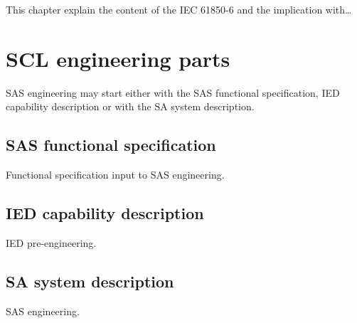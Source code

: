 This chapter explain the content of the 
IEC 61850-6 \cite{IEC61850-6:2004} and 
the implication with\ldots {} 

\section{SCL engineering parts} \label{sec:SCL-engineering-parts}
SAS engineering may start either with the SAS functional 
specification, IED capability description or with the 
SA system description.


\subsection{SAS functional specification}
Functional specification input to SAS engineering.

\subsection{IED capability description}
IED pre-engineering.

\subsection{SA system description}
SAS engineering.

